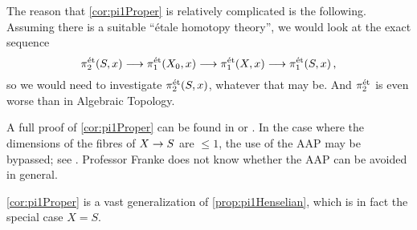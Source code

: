 \documentclass[a4paper, 10pt, oneside, DIV=9, chapterprefix=true, numbers=enddot, bibliography=totoc]{scrbook}
\begin{document}
\begin{rem}
	\begin{alphanumerate}
		\item The reason that \cref{cor:pi1Proper} is relatively complicated is the following. Assuming there is a suitable \enquote{étale homotopy theory}, we would look at the exact sequence
		\begin{equation*}
		\pi_2^\et(S,x)\morphism\pi_1^\et(X_0,x)\morphism\pi_1^\et(X,x)\morphism\pi_1^\et(S,x)\,,
		\end{equation*}
		so we would need to investigate $\pi_2^{\mathrm{\acute{e}t}}(S,x)$, whatever that may be. And $\pi_2^{\mathrm{\acute{e}t}}$ is even worse than in Algebraic Topology.
		\item A full proof of \cref{cor:pi1Proper} can be found in \cite[Arcata IV Prop.]{sga4.5} or \cite[]{stacks-project}. In the case where the dimensions of the fibres of $X\morphism S$ are $\leq 1$, the use of the AAP may be bypassed; see \cite[Exposé~XIII Prop.]{sga4.3}. Professor Franke does not know whether the AAP can be avoided in general.
		\item \cref{cor:pi1Proper} is a vast generalization of \cref{prop:pi1Henselian}, which is in fact the special case $X=S$.
	\end{alphanumerate}
\end{rem}
\end{document}
